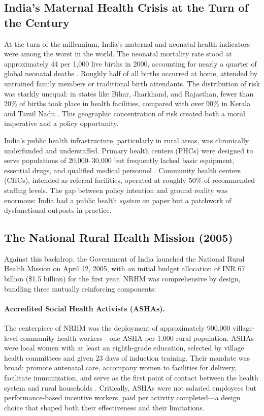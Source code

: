 \documentclass[12pt]{article}
\begin{document}
\subsection{India's Maternal Health Crisis at the Turn of the Century}

At the turn of the millennium, India's maternal and neonatal health indicators were among the worst in the world. The neonatal mortality rate stood at approximately 44 per 1,000 live births in 2000, accounting for nearly a quarter of global neonatal deaths \citep{lawn2005neonatal}. Roughly half of all births occurred at home, attended by untrained family members or traditional birth attendants. The distribution of risk was starkly unequal: in states like Bihar, Jharkhand, and Rajasthan, fewer than 20\% of births took place in health facilities, compared with over 90\% in Kerala and Tamil Nadu \citep{iips2007nfhs3}. This geographic concentration of risk created both a moral imperative and a policy opportunity.

India's public health infrastructure, particularly in rural areas, was chronically underfunded and understaffed. Primary health centers (PHCs) were designed to serve populations of 20,000--30,000 but frequently lacked basic equipment, essential drugs, and qualified medical personnel \citep{NRHM2012}. Community health centers (CHCs), intended as referral facilities, operated at roughly 50\% of recommended staffing levels. The gap between policy intention and ground reality was enormous: India had a public health \emph{system} on paper but a patchwork of dysfunctional outposts in practice.

\subsection{The National Rural Health Mission (2005)}

Against this backdrop, the Government of India launched the National Rural Health Mission on April 12, 2005, with an initial budget allocation of INR 67 billion (\$1.5 billion) for the first year. NRHM was comprehensive by design, bundling three mutually reinforcing components:

\paragraph{Accredited Social Health Activists (ASHAs).} The centerpiece of NRHM was the deployment of approximately 900,000 village-level community health workers---one ASHA per 1,000 rural population. ASHAs were local women with at least an eighth-grade education, selected by village health committees and given 23 days of induction training. Their mandate was broad: promote antenatal care, accompany women to facilities for delivery, facilitate immunization, and serve as the first point of contact between the health system and rural households \citep{rao2016asha}. Critically, ASHAs were not salaried employees but performance-based incentive workers, paid per activity completed---a design choice that shaped both their effectiveness and their limitations.
\end{document}
